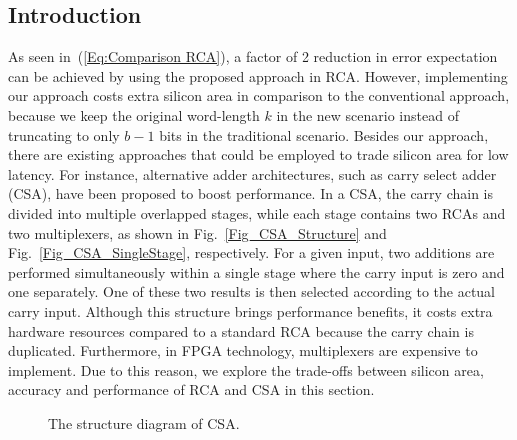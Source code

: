 \documentclass[prodmode,acmtrets]{acmsmall} %
\begin{document}
\subsection{Introduction}
As seen in~(\ref{Eq:Comparison RCA}), a factor of 2 reduction in error expectation can be achieved by using the proposed approach in RCA. However, implementing our approach costs extra silicon area in comparison to the conventional approach, because we keep the original word-length $k$ in the new scenario instead of truncating to only $b-1$ bits in the traditional scenario. Besides our approach, there are existing approaches that could be employed to trade silicon area for low latency. For instance, alternative adder architectures, such as carry select adder (CSA), have been proposed to boost performance. In a CSA, the carry chain is divided into multiple overlapped stages, while each stage contains two RCAs and two multiplexers, as shown in Fig.~\ref{Fig_CSA_Structure} and Fig.~\ref{Fig_CSA_SingleStage}, respectively. For a given input, two additions are performed simultaneously within a single stage where the carry input is zero and one separately. One of these two results is then selected according to the actual carry input. Although this structure brings performance benefits, it costs extra hardware resources compared to a standard RCA because the carry chain is duplicated. Furthermore, in FPGA technology, multiplexers are expensive to implement. Due to this reason, we explore the trade-offs between silicon area, accuracy and performance of RCA and CSA in this section.
\vspace{-7ex}
\begin{figure}[htbp]
        \centering
    \vspace{-2ex}
    \caption{The structure diagram of CSA.}
\end{figure}
\vspace{-2ex}
\end{document}
